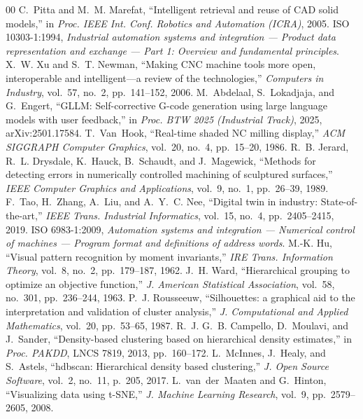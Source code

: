 \documentclass[conference]{IEEEtran}
\begin{document}
\begin{thebibliography}{00}
 C.~Pitta and M.~M. Marefat, ``Intelligent retrieval and reuse of CAD solid models,'' in \emph{Proc. IEEE Int. Conf. Robotics and Automation (ICRA)}, 2005.
 ISO 10303-1:1994, \emph{Industrial automation systems and integration --- Product data representation and exchange --- Part 1: Overview and fundamental principles}.
 X.~W. Xu and S.~T. Newman, ``Making CNC machine tools more open, interoperable and intelligent---a review of the technologies,'' \emph{Computers in Industry}, vol.~57, no.~2, pp.~141--152, 2006.
 M.~Abdelaal, S.~Lokadjaja, and G.~Engert, ``GLLM: Self-corrective G-code generation using large language models with user feedback,'' in \emph{Proc. BTW 2025 (Industrial Track)}, 2025, arXiv:2501.17584.
 T.~Van~Hook, ``Real-time shaded NC milling display,'' \emph{ACM SIGGRAPH Computer Graphics}, vol.~20, no.~4, pp.~15--20, 1986.
 R.~B. Jerard, R.~L. Drysdale, K.~Hauck, B.~Schaudt, and J.~Magewick, ``Methods for detecting errors in numerically controlled machining of sculptured surfaces,'' \emph{IEEE Computer Graphics and Applications}, vol.~9, no.~1, pp.~26--39, 1989.
 F.~Tao, H.~Zhang, A.~Liu, and A.~Y.~C. Nee, ``Digital twin in industry: State-of-the-art,'' \emph{IEEE Trans. Industrial Informatics}, vol.~15, no.~4, pp.~2405--2415, 2019.
 ISO 6983-1:2009, \emph{Automation systems and integration --- Numerical control of machines --- Program format and definitions of address words}.
 M.-K. Hu, ``Visual pattern recognition by moment invariants,'' \emph{IRE Trans. Information Theory}, vol.~8, no.~2, pp.~179--187, 1962.
 J.~H. Ward, ``Hierarchical grouping to optimize an objective function,'' \emph{J. American Statistical Association}, vol.~58, no.~301, pp.~236--244, 1963.
 P.~J. Rousseeuw, ``Silhouettes: a graphical aid to the interpretation and validation of cluster analysis,'' \emph{J. Computational and Applied Mathematics}, vol.~20, pp.~53--65, 1987.
 R.~J. G.~B. Campello, D.~Moulavi, and J.~Sander, ``Density-based clustering based on hierarchical density estimates,'' in \emph{Proc. PAKDD}, LNCS 7819, 2013, pp.~160--172.
 L.~McInnes, J.~Healy, and S.~Astels, ``hdbscan: Hierarchical density based clustering,'' \emph{J. Open Source Software}, vol.~2, no.~11, p.~205, 2017.
 L.~van~der~Maaten and G.~Hinton, ``Visualizing data using t-SNE,'' \emph{J. Machine Learning Research}, vol.~9, pp.~2579--2605, 2008.

\end{thebibliography}
\end{document}
